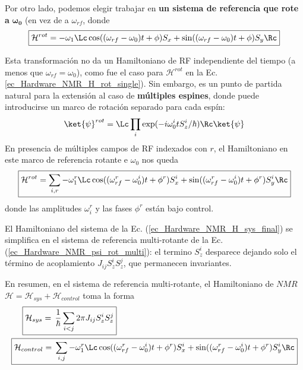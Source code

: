 Por otro lado, podemos elegir trabajar en \textbf{un sistema de referencia que rote a} $\bm{\omega_0}$ (en vez de a $\omega_{rf}$, donde
	\begin{equation}
	\boxed{\mathcal{H}^{rot} = - \omega_1 \Lc \cos ((\omega_{rf} - \omega_0)t + \phi) S_x + \sin ((\omega_{rf} - \omega_0)t + \phi) S_y \Rc}
	\end{equation}

Esta transformación no da un Hamiltoniano de RF independiente del tiempo (a menos que $\omega_{rf} = \omega_0$), como fue el caso para $\mathcal{H}^{rot}$ en la Ec. \ref{ec_Hardware_NMR_H_rot_single}). Sin embargo, es un punto de partida natural para la extensión al caso de \textbf{múltiples espines}, donde puede introducirse un marco de rotación separado para cada espín:
	\begin{equation} \label{ec_Hardware_NMR_psi_rot_multi}
	\ket{\psi}^{rot} = \Lc \prod_i \exp (-i \omega_0^i t S^i_z/\hbar ) \Rc \ket{\psi}
	\end{equation}
En presencia de múltiples campos de RF indexados con $r$, el Hamiltoniano en este marco de referencia rotante e $\omega_0$ nos queda
	\begin{equation}
	\boxed{\mathcal{H}^{rot} = \sum_{i,r} - \omega_1^r \Lc \cos ((\omega_{rf}^r - \omega_0^i)t + \phi^r) S_x^i + \sin ((\omega_{rf}^r - \omega_0^i) t +\phi^r) S_y^i  \Rc}
	\end{equation}
donde las amplitudes $\omega_i^r$ y las fases $\phi^r$ están bajo control. 

El Hamiltoniano del sistema de la Ec. (\ref{ec_Hardware_NMR_H_sys_final}) se simplifica en el sistema de referencia multi-rotante de la Ec. (\ref{ec_Hardware_NMR_psi_rot_multi}): el termino $S_z^i$ desparece dejando solo el término de acoplamiento $J_{ij} S_z^i S_z^j$, que permanecen invariantes.

En resumen, en el sistema de referencia multi-rotante, el Hamiltoniano de $NMR$ $\mathcal{H} = \mathcal{H}_{sys} + \mathcal{H}_{control}$ toma la forma
	\begin{equation} \label{ec_Hardware_NMR_H_sys_control_final_multi_rot} 
	\begin{aligned}
	& ~~~~ \boxed{ \mathcal{H}_{sys} =  \, \frac{1}{\hbar} \sum_{i<j} 2 \pi J_{ij} S_z^i S_z^j} \\
	&\boxed{\mathcal{H}_{control} =  \, \sum_{i,j} - \omega_1^r \Lc \cos ((\omega_{rf}^r - \omega_0^i)t +\phi^r) S_x^i + \sin ((\omega_{rf}^r-\omega_0^i)t +\phi^r) S^i_y \Rc} 
	\end{aligned}
	\end{equation}








